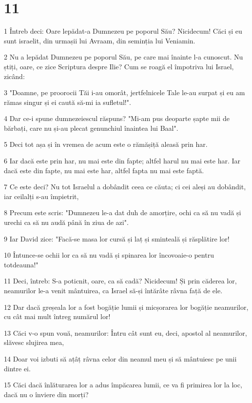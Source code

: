 \chapter{11}

\par 1 Întreb deci: Oare lepădat-a Dumnezeu pe poporul Său? Nicidecum! Căci și eu sunt israelit, din urmașii lui Avraam, din seminția lui Veniamin.
\par 2 Nu a lepădat Dumnezeu pe poporul Său, pe care mai înainte l-a cunoscut. Nu știți, oare, ce zice Scriptura despre Ilie? Cum se roagă el împotriva lui Israel, zicând:
\par 3 "Doamne, pe proorocii Tăi i-au omorât, jertfelnicele Tale le-au surpat și eu am rămas singur și ei caută să-mi ia sufletul!".
\par 4 Dar ce-i spune dumnezeiescul răspuns? "Mi-am pus deoparte șapte mii de bărbați, care nu și-au plecat genunchiul înaintea lui Baal".
\par 5 Deci tot așa și în vremea de acum este o rămășiță aleasă prin har.
\par 6 Iar dacă este prin har, nu mai este din fapte; altfel harul nu mai este har. Iar dacă este din fapte, nu mai este har, altfel fapta nu mai este faptă.
\par 7 Ce este deci? Nu tot Israelul a dobândit ceea ce căuta; ci cei aleși au dobândit, iar ceilalți s-au împietrit,
\par 8 Precum este scris: "Dumnezeu le-a dat duh de amorțire, ochi ca să nu vadă și urechi ca să nu audă până în ziua de azi".
\par 9 Iar David zice: "Facă-se masa lor cursă și laț și sminteală și răsplătire lor!
\par 10 Întunce-se ochii lor ca să nu vadă și spinarea lor încovoaie-o pentru totdeauna!"
\par 11 Deci, întreb: S-a poticnit, oare, ca să cadă? Nicidecum! Și prin căderea lor, neamurilor le-a venit mântuirea, ca Israel să-și întărâte râvna față de ele.
\par 12 Dar dacă greșeala lor a fost bogăție lumii și micșorarea lor bogăție neamurilor, cu cât mai mult întreg numărul lor!
\par 13 Căci v-o spun vouă, neamurilor: Întru cât sunt eu, deci, apostol al neamurilor, slăvesc slujirea mea,
\par 14 Doar voi izbuti să ațâț râvna celor din neamul meu și să mântuiesc pe unii dintre ei.
\par 15 Căci dacă înlăturarea lor a adus împăcarea lumii, ce va fi primirea lor la loc, dacă nu o înviere din morți?
